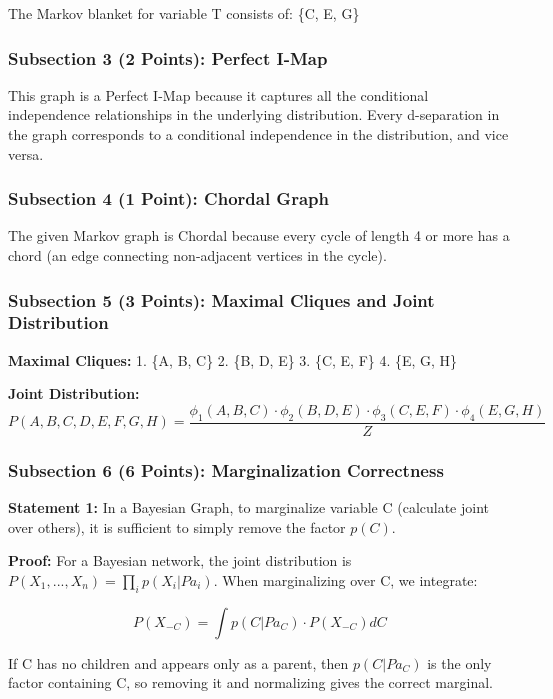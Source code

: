 \documentclass[conference]{IEEEtran}
\begin{document}
The Markov blanket for variable T consists of: \{C, E, G\}

\subsubsection{Subsection 3 (2 Points): Perfect I-Map}

This graph is a Perfect I-Map because it captures all the conditional independence relationships in the underlying distribution. Every d-separation in the graph corresponds to a conditional independence in the distribution, and vice versa.

\subsubsection{Subsection 4 (1 Point): Chordal Graph}

The given Markov graph is Chordal because every cycle of length 4 or more has a chord (an edge connecting non-adjacent vertices in the cycle).

\subsubsection{Subsection 5 (3 Points): Maximal Cliques and Joint Distribution}

\textbf{Maximal Cliques:}
1. \{A, B, C\}
2. \{B, D, E\}
3. \{C, E, F\}
4. \{E, G, H\}

\textbf{Joint Distribution:}
\[P(A,B,C,D,E,F,G,H) = \frac{\phi_1(A,B,C) \cdot \phi_2(B,D,E) \cdot \phi_3(C,E,F) \cdot \phi_4(E,G,H)}{Z}\]

\subsubsection{Subsection 6 (6 Points): Marginalization Correctness}

\textbf{Statement 1:} In a Bayesian Graph, to marginalize variable C (calculate joint over others), it is sufficient to simply remove the factor $p(C)$.

\textbf{Proof:} For a Bayesian network, the joint distribution is $P(X_1,...,X_n) = \prod_i p(X_i | Pa_i)$. When marginalizing over C, we integrate:

\[P(X_{-C}) = \int p(C | Pa_C) \cdot P(X_{-C}) dC\]

If C has no children and appears only as a parent, then $p(C | Pa_C)$ is the only factor containing C, so removing it and normalizing gives the correct marginal.
\end{document}
